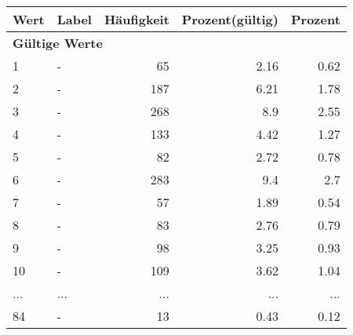      \begin{longtable}{lXrrr}
     \toprule
     \textbf{Wert} & \textbf{Label} & \textbf{Häufigkeit} & \textbf{Prozent(gültig)} & \textbf{Prozent} \\
     \endhead
     \midrule
     \multicolumn{5}{l}{\textbf{Gültige Werte}}\\
        1 & \multicolumn{1}{X}{-} & %
          \num{65} &
          \num[round-mode=places,round-precision=2]{2,16} &
          \num[round-mode=places,round-precision=2]{0,62} \\
        2 & \multicolumn{1}{X}{-} & %
          \num{187} &
          \num[round-mode=places,round-precision=2]{6,21} &
          \num[round-mode=places,round-precision=2]{1,78} \\
        3 & \multicolumn{1}{X}{-} & %
          \num{268} &
          \num[round-mode=places,round-precision=2]{8,9} &
          \num[round-mode=places,round-precision=2]{2,55} \\
        4 & \multicolumn{1}{X}{-} & %
          \num{133} &
          \num[round-mode=places,round-precision=2]{4,42} &
          \num[round-mode=places,round-precision=2]{1,27} \\
        5 & \multicolumn{1}{X}{-} & %
          \num{82} &
          \num[round-mode=places,round-precision=2]{2,72} &
          \num[round-mode=places,round-precision=2]{0,78} \\
        6 & \multicolumn{1}{X}{-} & %
          \num{283} &
          \num[round-mode=places,round-precision=2]{9,4} &
          \num[round-mode=places,round-precision=2]{2,7} \\
        7 & \multicolumn{1}{X}{-} & %
          \num{57} &
          \num[round-mode=places,round-precision=2]{1,89} &
          \num[round-mode=places,round-precision=2]{0,54} \\
        8 & \multicolumn{1}{X}{-} & %
          \num{83} &
          \num[round-mode=places,round-precision=2]{2,76} &
          \num[round-mode=places,round-precision=2]{0,79} \\
        9 & \multicolumn{1}{X}{-} & %
          \num{98} &
          \num[round-mode=places,round-precision=2]{3,25} &
          \num[round-mode=places,round-precision=2]{0,93} \\
        10 & \multicolumn{1}{X}{-} & %
          \num{109} &
          \num[round-mode=places,round-precision=2]{3,62} &
          \num[round-mode=places,round-precision=2]{1,04} \\
       ... & ... & ... & ... & ... \\
        84 & \multicolumn{1}{X}{-} & %
          \num{13} &
          \num[round-mode=places,round-precision=2]{0,43} &
          \num[round-mode=places,round-precision=2]{0,12} \\


\end{longtable}
